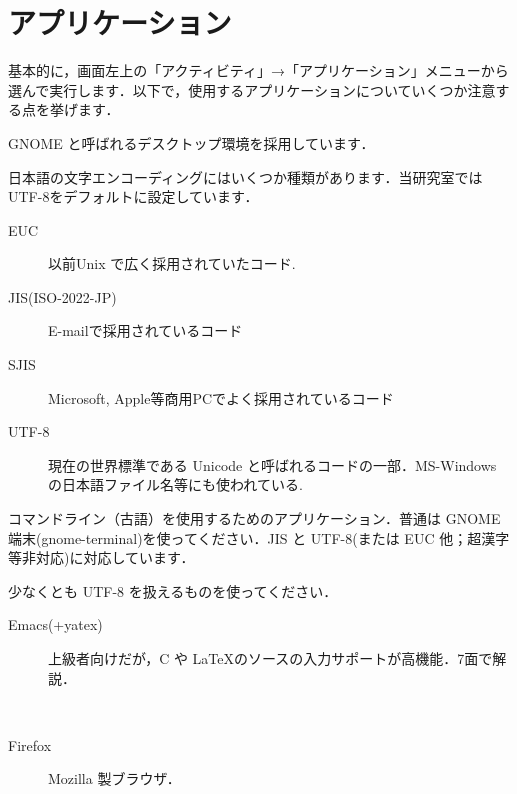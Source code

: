 \documentclass[main]{subfiles}
\begin{document}
\vspace{10pt}
\chapter{アプリケーション}
\fontsize{10}{13} \selectfont

基本的に，画面左上の「アクティビティ」→「アプリケーション」メニューから選んで実行します．以下で，使用するアプリケーションについていくつか注意する点を挙げます．\\

\begin{description}[itemsep=1em]
    \item[デスクトップ環境] GNOME と呼ばれるデスクトップ環境を採用しています．
    \item[日本語エンコーディング] 日本語の文字エンコーディングにはいくつか種類があります．当研究室ではUTF-8をデフォルトに設定しています．
    \begin{description}
        \item[EUC] 以前Unix で広く採用されていたコード.
        \item[JIS(ISO-2022-JP)] E-mailで採用されているコード
        \item[SJIS] Microsoft, Apple等商用PCでよく採用されているコード
        \item[UTF-8] 現在の世界標準である Unicode と呼ばれるコードの一部．MS-Windows の日本語ファイル名等にも使われている.
    \end{description}
    
    \item[端末エミュレータ] コマンドライン（古語）を使用するためのアプリケーション．普通は GNOME 端末(gnome-terminal)を使ってください．JIS と UTF-8(または EUC 他；超漢字等非対応)に対応しています．
    \item[テキストエディタ] 少なくとも UTF-8 を扱えるものを使ってください．
    \begin{description}
        \item[Emacs(+yatex)] 上級者向けだが，C や \LaTeX のソースの入力サポートが高機能．7面で解説．
    \end{description}
    \item[Web ブラウザ] 　
    \begin{description}
        \item[Firefox] Mozilla 製ブラウザ．
    \end{description}
    \item[メーラー] 　
    




\end{description}
\end{document}
